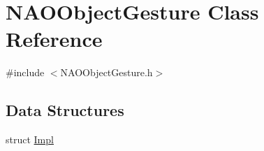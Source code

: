 \hypertarget{classNAOObjectGesture}{\section{\-N\-A\-O\-Object\-Gesture \-Class \-Reference}
\label{classNAOObjectGesture}
}


{\ttfamily \#include $<$\-N\-A\-O\-Object\-Gesture.\-h$>$}

\subsection*{\-Data \-Structures}
\begin{DoxyCompactItemize}
\item 
struct \hyperlink{structNAOObjectGesture_1_1Impl}{\-Impl}
\end{DoxyCompactItemize}
